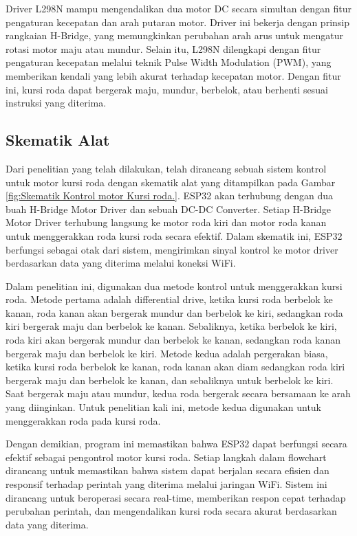 Driver L298N mampu mengendalikan dua motor DC secara simultan dengan fitur pengaturan kecepatan dan arah putaran motor. Driver ini bekerja dengan prinsip rangkaian H-Bridge, yang memungkinkan perubahan arah arus untuk mengatur rotasi motor maju atau mundur. Selain itu, L298N dilengkapi dengan fitur pengaturan kecepatan melalui teknik Pulse Width Modulation (PWM), yang memberikan kendali yang lebih akurat terhadap kecepatan motor. Dengan fitur ini, kursi roda dapat bergerak maju, mundur, berbelok, atau berhenti sesuai instruksi yang diterima.

\subsection{Skematik Alat}
\label{subsec:skematikalat}

Dari penelitian yang telah dilakukan, telah dirancang sebuah sistem kontrol untuk motor kursi roda dengan skematik alat yang ditampilkan pada Gambar \ref{fig:Skematik Kontrol motor Kursi roda.}. ESP32 akan terhubung dengan dua buah H-Bridge Motor Driver dan sebuah DC-DC Converter. Setiap H-Bridge Motor Driver terhubung langsung ke motor roda kiri dan motor roda kanan untuk menggerakkan roda kursi roda secara efektif. Dalam skematik ini, ESP32 berfungsi sebagai otak dari sistem, mengirimkan sinyal kontrol ke motor driver berdasarkan data yang diterima melalui koneksi WiFi. \parencite{ekatama2024perancangan}

Dalam penelitian ini, digunakan dua metode kontrol untuk menggerakkan kursi roda. Metode pertama adalah differential drive, ketika kursi roda berbelok ke kanan, roda kanan akan bergerak mundur dan berbelok ke kiri, sedangkan roda kiri bergerak maju dan berbelok ke kanan. Sebaliknya, ketika berbelok ke kiri, roda kiri akan bergerak mundur dan berbelok ke kanan, sedangkan roda kanan bergerak maju dan berbelok ke kiri. Metode kedua adalah pergerakan biasa, ketika kursi roda berbelok ke kanan, roda kanan akan diam sedangkan roda kiri bergerak maju dan berbelok ke kanan, dan sebaliknya untuk berbelok ke kiri. Saat bergerak maju atau mundur, kedua roda bergerak secara bersamaan ke arah yang diinginkan. Untuk penelitian kali ini, metode kedua digunakan untuk menggerakkan roda pada kursi roda.

Dengan demikian, program ini memastikan bahwa ESP32 dapat berfungsi secara efektif sebagai pengontrol motor kursi roda. Setiap langkah dalam flowchart dirancang untuk memastikan bahwa sistem dapat berjalan secara efisien dan responsif terhadap perintah yang diterima melalui jaringan WiFi. Sistem ini dirancang untuk beroperasi secara real-time, memberikan respon cepat terhadap perubahan perintah, dan mengendalikan kursi roda secara akurat berdasarkan data yang diterima.

